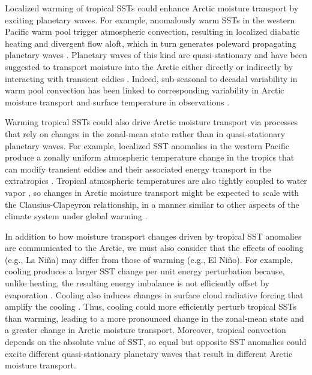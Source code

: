 \documentclass[draft]{agujournal2019}
\begin{document}
Localized warming of tropical SSTs could enhance Arctic moisture transport by exciting planetary waves. For example, anomalously warm SSTs in the western Pacific warm pool trigger atmospheric convection, resulting in localized diabatic heating and divergent flow aloft, which in turn generates poleward propagating planetary waves \cite{HoskinsKaroly1981, SardeshmukhHoskins1988, Branstator2014}. Planetary waves of this kind are quasi-stationary and have been suggested to transport moisture into the Arctic either directly or indirectly by interacting with transient eddies \cite{Lee2014, Yoo2012a, BaggettLee2015, Baggett2016, Goss2016, Baggett2017, Lee2019, ParkLee2019}. Indeed, sub-seasonal to decadal variability in warm pool convection has been linked to corresponding variability in Arctic moisture transport and surface temperature in observations \cite{Lee2011a, Lee2012, Yoo2011, Gong2017}.


Warming tropical SSTs could also drive Arctic moisture transport via processes that rely on changes in the zonal-mean state rather than in quasi-stationary planetary waves. For example, localized SST anomalies in the western Pacific produce a zonally uniform atmospheric temperature change in the tropics \cite{YulaevaWallace1994,Sobel2001} that can modify transient eddies and their associated energy transport in the extratropics \cite{Robinson2002, Seager2003, LheureuxThompson2006}. Tropical atmospheric temperatures are also tightly coupled to water vapor \cite{WentzSchabel2000, Trenberth2005}, so changes in Arctic moisture transport might be expected to scale with the Clausius-Clapeyron relationship, in a manner similar to other aspects of the climate system under global warming \cite{HeldSoden2006, LorenzDeWeaver2007, Seager2010}. 


In addition to how moisture transport changes driven by tropical SST anomalies are communicated to the Arctic, we must also consider that the effects of cooling (e.g., La Ni\~na) may differ from those of warming (e.g., El Ni\~no). For example, cooling produces a larger SST change per unit energy perturbation because, unlike heating, the resulting energy imbalance is not efficiently offset by evaporation \cite{Shin2017}. Cooling also induces changes in surface cloud radiative forcing that amplify the cooling \cite{Shaw2015}. Thus, cooling could more efficiently perturb tropical SSTs than warming, leading to a more pronounced change in the zonal-mean state and a greater change in Arctic moisture transport. Moreover, tropical convection depends  on the absolute value of SST, so equal but opposite SST anomalies could excite different quasi-stationary planetary waves \cite{Hoerling1997} that result in different Arctic moisture transport.
\end{document}
